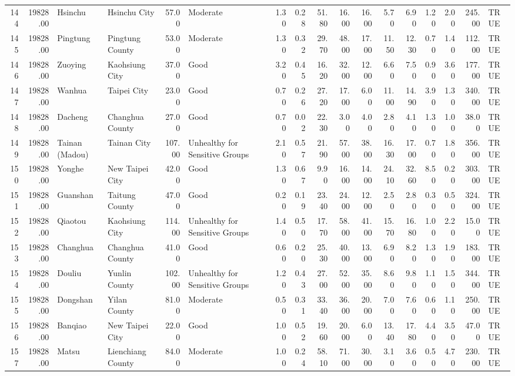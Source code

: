 \begin{table}[ht]
\begin{tabular}{rrllrlrrrrrrrrrrl}
  144 & 19828.00 & Hsinchu & Hsinchu City & 57.00 & Moderate & 1.30 & 0.28 & 51.80 & 16.00 & 16.00 & 5.70 & 6.90 & 1.20 & 2.00 & 245.00 & TRUE \\ 
  145 & 19828.00 & Pingtung & Pingtung County & 53.00 & Moderate & 1.30 & 0.32 & 29.70 & 48.00 & 17.00 & 11.50 & 12.30 & 0.70 & 1.40 & 112.00 & TRUE \\ 
  146 & 19828.00 & Zuoying & Kaohsiung City & 37.00 & Good & 3.20 & 0.45 & 16.20 & 32.00 & 12.00 & 6.60 & 7.50 & 0.90 & 3.60 & 177.00 & TRUE \\ 
  147 & 19828.00 & Wanhua & Taipei City & 23.00 & Good & 0.70 & 0.26 & 27.20 & 17.00 & 6.00 & 11.00 & 14.90 & 3.90 & 1.30 & 340.00 & TRUE \\ 
  148 & 19828.00 & Dacheng & Changhua County & 27.00 & Good & 0.70 & 0.02 & 22.30 & 3.00 & 4.00 & 2.80 & 4.10 & 1.30 & 1.00 & 38.00 & TRUE \\ 
  149 & 19828.00 & Tainan (Madou) & Tainan City & 107.00 & Unhealthy for Sensitive Groups & 2.10 & 0.57 & 21.90 & 57.00 & 38.00 & 16.30 & 17.00 & 0.70 & 1.80 & 356.00 & TRUE \\ 
  150 & 19828.00 & Yonghe & New Taipei City & 42.00 & Good & 1.30 & 0.67 & 9.90 & 16.00 & 14.00 & 24.10 & 32.60 & 8.50 & 0.20 & 303.00 & TRUE \\ 
  151 & 19828.00 & Guanshan & Taitung County & 47.00 & Good & 0.20 & 0.19 & 23.40 & 24.00 & 12.00 & 2.50 & 2.80 & 0.30 & 0.50 & 324.00 & TRUE \\ 
  152 & 19828.00 & Qiaotou & Kaohsiung City & 114.00 & Unhealthy for Sensitive Groups & 1.40 & 0.50 & 17.70 & 58.00 & 41.00 & 15.70 & 16.80 & 1.00 & 2.20 & 15.00 & TRUE \\ 
  153 & 19828.00 & Changhua & Changhua County & 41.00 & Good & 0.60 & 0.20 & 25.30 & 40.00 & 13.00 & 6.90 & 8.20 & 1.30 & 1.90 & 183.00 & TRUE \\ 
  154 & 19828.00 & Douliu & Yunlin County & 102.00 & Unhealthy for Sensitive Groups & 1.20 & 0.43 & 27.00 & 52.00 & 35.00 & 8.60 & 9.80 & 1.10 & 1.50 & 344.00 & TRUE \\ 
  155 & 19828.00 & Dongshan & Yilan County & 81.00 & Moderate & 0.50 & 0.31 & 33.40 & 36.00 & 20.00 & 7.00 & 7.60 & 0.60 & 1.10 & 250.00 & TRUE \\ 
  156 & 19828.00 & Banqiao & New Taipei City & 22.00 & Good & 1.00 & 0.52 & 19.60 & 20.00 & 6.00 & 13.40 & 17.80 & 4.40 & 3.50 & 47.00 & TRUE \\ 
  157 & 19828.00 & Matsu & Lienchiang County & 84.00 & Moderate & 1.00 & 0.24 & 58.10 & 71.00 & 30.00 & 3.10 & 3.60 & 0.50 & 4.70 & 230.00 & TRUE \\ 

\end{tabular}
\end{table}
